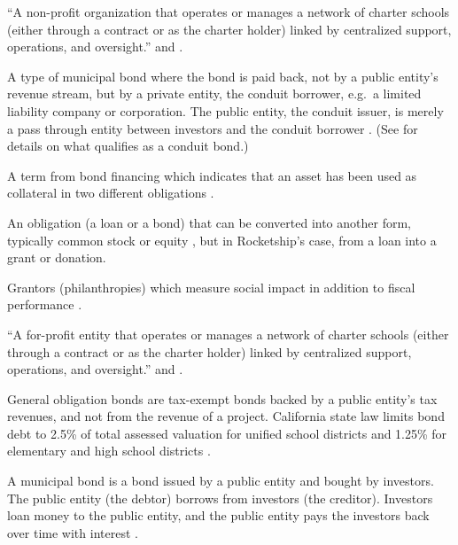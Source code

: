 \begin{description}[nosep]
  \medskip\item[charter management organization (CMO)] ``A non-profit organization that operates or manages a network of charter schools (either through a contract or as the charter holder) linked by centralized support, operations, and oversight.'' \parencite[2]{USDoEd2021} and \parencite{CDE2023a}.

  \medskip\item[conduit bond] A type of municipal bond where the bond is paid back, not by a public entity's revenue stream, but by a private entity, the conduit borrower, e.g. a limited liability company or corporation. The public entity, the conduit issuer, is merely a pass through entity between investors and the conduit borrower \parencite{Cooper2017}. (See \textcite{GASB91_2019} for details on what qualifies as a conduit bond.) %

  \medskip\item[cross-collateralization] A term from bond financing which indicates that an asset has been used as collateral in two different obligations \parencite{Lip2024}.

  \medskip\item[debt, convertible] An obligation (a loan or a bond) that can be converted into another form, typically common stock or equity \parencite{Chen2020}, but in Rocketship's case, from a loan into a grant or donation.

  \medskip\item[double bottom line grantors] Grantors (philanthropies) which measure social impact in addition to fiscal performance \parencite{Clark.etal2015}.

  \medskip\item[education management organization (EMO)] ``A for-profit entity that operates or manages a network of charter schools (either through a contract or as the charter holder) linked by centralized support, operations, and oversight.'' \parencite[2]{USDoEd2021} and \parencite{CDE2023a}. %

  \medskip\item[general obligation bonds (GO)] General obligation bonds are tax-exempt bonds backed by a public entity's tax revenues, and not from the revenue of a project. California state law limits bond debt to 2.5\% of total assessed valuation for unified school districts and 1.25\% for elementary and high school districts \parencite{CDIAC2014}.

  \medskip\item[municipal bond] A municipal bond is a bond issued by a public entity and bought by investors. The public entity (the debtor) borrows from investors (the creditor). Investors loan money to the public entity, and the public entity pays the investors back over time with interest \parencite{Chen2022}.


\end{description}
